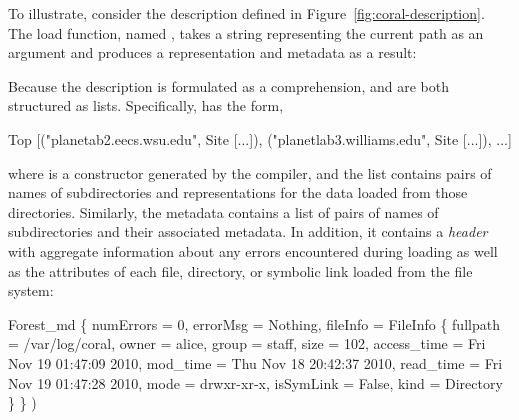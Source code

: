 \documentclass[nocopyrightspace,natbib]{sigplanconf}
\begin{document}
To illustrate, consider the  description defined in
Figure~\ref{fig:coral-description}. The load function, named
, takes a string representing the current path as an
argument and produces a representation and metadata as a result:
%
Because the  description is formulated as a comprehension,
 and  are both structured as lists. Specifically,
 has the form,
\begin{code}
Top [("planetab2.eecs.wsu.edu", Site [...]),
     ("planetlab3.williams.edu", Site [...]), ...]
\end{code}
where  is a constructor generated by the compiler, and the
list contains pairs of names of subdirectories and representations for
the data loaded from those directories. Similarly, the metadata
 contains a list of pairs of names of subdirectories and their
associated metadata. In addition, it contains a \emph{header} with
aggregate information about any errors encountered during loading as
well as the attributes of each file, directory, or symbolic link
loaded from the file system:
%
\begin{code}
Forest_md 
  \{ numErrors = 0, 
    errorMsg = Nothing, 
    fileInfo = FileInfo
      \{ fullpath = /var/log/coral, 
        owner = alice, group = staff, size = 102, 
        access_time = Fri Nov 19 01:47:09 2010, 
        mod_time = Thu Nov 18 20:42:37 2010, 
        read_time = Fri Nov 19 01:47:28 2010, 
        mode = drwxr-xr-x, isSymLink = False, 
        kind = Directory \} \} )
\end{code}
%
\end{document}
